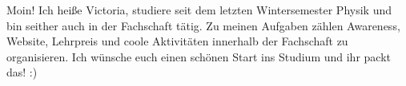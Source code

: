 \begin{multicols}{2}
{
Moin! Ich heiße Victoria, studiere seit dem letzten Wintersemester Physik und bin seither auch in der Fachschaft tätig. Zu meinen Aufgaben zählen Awareness, Website, Lehrpreis und coole Aktivitäten innerhalb der Fachschaft zu organisieren. Ich wünsche euch einen schönen Start ins Studium und ihr packt das! :)
}

\vspace{-0.15cm}


\end{multicols}
